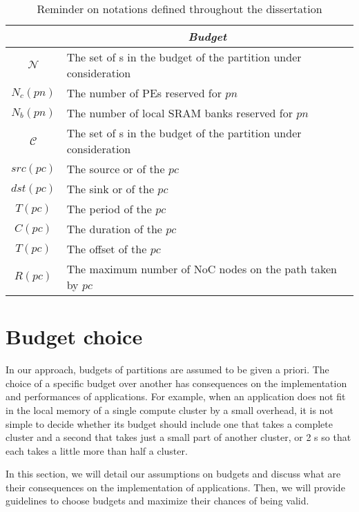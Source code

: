 \documentclass[main.tex]{subfiles}
\begin{document}
\begin{table}
\begin{center}
\begin{tabular*}{\linewidth}{@{\extracolsep{\fill}} c l}
        \hline
         & \multicolumn{1}{c}{\emph{Budget} } \\
        \hline
        $\mathcal{N}$       & The set of \PN{}s in the budget of the partition under consideration \\
        $N_c(pn)$           & The number of PEs reserved for \PN{} $pn$\\
        $N_b(pn)$           & The number of local SRAM banks reserved for \PN{} $pn$\\
        $\mathcal{C}$       & The set of \PC{}s in the budget of the partition under consideration \\
        $src(pc)$           & The source \PN{} or \ION{} of the \PC{} $pc$ \\
        $dst(pc)$           & The sink \PN{} or \ION{} of the \PC{} $pc$ \\
        $T(pc)$             & The period of the \PC{} $pc$ \\        
        $C(pc)$             & The duration of the \PC{} $pc$ \\        
        $T(pc)$             & The offset of the \PC{} $pc$ \\        
        $R(pc)$             & The maximum number of NoC nodes on the path taken by \PC{} $pc$ \\        

        \hline	
\end{tabular*}
\end{center}
\caption{Reminder on notations defined throughout the dissertation}
\label{table_validation_notations}
\end{table}




\section{Budget choice}
In our approach, budgets of partitions are assumed to be given a priori. The
choice of a specific budget over another has consequences on the implementation
and performances of applications. For example, when an application does not fit
in the local memory of a single compute cluster by a small overhead, it is not
simple to decide whether its budget should include one \PN{} that takes a
complete cluster and a second \PN{} that takes just a small part of another
cluster, or 2 \PN{}s so that each takes a little more than half a cluster. 

In this section, we will detail our assumptions on budgets and discuss what are
their consequences on the implementation of applications. Then, we will provide
guidelines to choose budgets and maximize their chances of being valid.
\end{document}
